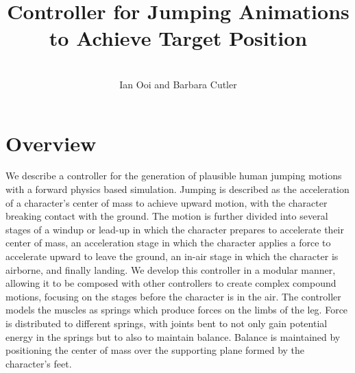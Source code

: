 \documentclass[landscape,26pt]{sciposter}
\title{Controller for Jumping Animations to Achieve Target Position}
\author{\ \\ Ian Ooi and Barbara Cutler}
\institute{Department of Computer Science\\
           Rensselaer Polytechnic Institute\\}
\begin{document}


\maketitle

\begin{minipage}[t]{10.5in}
	\section*{Overview}
		We describe a controller for the generation of plausible human jumping motions with a forward physics based simulation.  Jumping is described as the acceleration of a character's center of mass to achieve upward motion, with the character breaking contact with the ground.  The motion is further divided into several stages of a windup or lead-up in which the character prepares to accelerate their center of mass, an acceleration stage in which the character applies a force to accelerate upward to leave the ground, an in-air stage in which the character is airborne, and finally landing.  We develop this controller in a modular manner, allowing it to be composed with other controllers to create complex compound motions, focusing on the stages before the character is in the air.  The controller models the muscles as springs which produce forces on the limbs of the leg.  Force is distributed to different springs, with joints bent to not only gain potential energy in the springs but to also to maintain balance.  Balance is maintained by positioning the center of mass over the supporting plane formed by the character's feet.

		\vspace{.3in}


\end{minipage}
\end{document}
